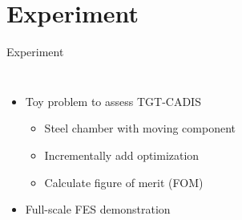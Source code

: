 \documentclass{beamer}
\begin{document}
\section{Experiment}
\begin{frame}{Experiment}
\begin{columns}
	\begin{itemize}
		\item{Toy problem to assess TGT-CADIS}
	\begin{itemize}
		\item{Steel chamber with moving component}
		\item{Incrementally add optimization}
		\item{Calculate figure of merit (FOM) }
	\end{itemize}
\item{Full-scale FES demonstration}
	\end{itemize}
\end{columns}
\end{frame}
\end{document}
